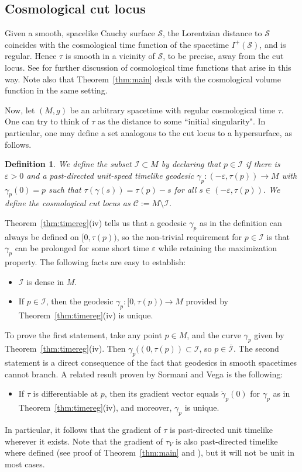 \documentclass[a4paper,11pt]{amsart}
\newtheorem{definition}[theorem]{{Definition}}%
\newcommand{\I}{\mathcal{I}}
\newcommand{\CS}{\mathcal{S}}
\begin{document}
\subsection{Cosmological cut locus}

Given a smooth, spacelike Cauchy surface $\CS$, the Lorentzian distance to $\CS$ coincides with the cosmological time function of the spacetime $I^+(\CS)$, and is regular. Hence $\tau$ is smooth in a vicinity of $\CS$, to be precise, away from the cut locus. See \cite{GrSo22} for further discussion of cosmological time functions that arise in this way. Note also that Theorem~\ref{thm:main} deals with the cosmological volume function in the same setting.

Now, let $(M,g)$ be an arbitrary spacetime with regular cosmological time $\tau$. One can try to think of $\tau$ as the distance to some ``initial singularity". In particular, one may define a set analogous to the cut locus to a hypersurface, as follows.

\begin{definition} \label{def:I}
 We define the subset $\I \subset M$ by declaring that $p \in \I$ if there is $\varepsilon > 0$ and a past-directed unit-speed timelike geodesic $\gamma_p \colon (-\varepsilon, \tau(p)) \to M$ with $\gamma_p(0) = p$ such that $\tau(\gamma(s)) = \tau(p) - s$ for all $s \in (-\varepsilon, \tau(p))$. We define the \emph{cosmological cut locus} as $\mathcal{C} := M \setminus \I$.
\end{definition}

Theorem~\ref{thm:timereg}(iv) tells us that a geodesic $\gamma_p$ as in the definition can always be defined on $[0,\tau(p))$, so the non-trivial requirement for $p \in \I$ is that $\gamma_p$ can be prolonged for some short time $\varepsilon$ while retaining the maximization property. The following facts are easy to establish:
\begin{itemize}
 \item $\I$ is dense in $M$.
 \item If $p \in \I$, then the geodesic $\gamma_p \colon [0,\tau(p)) \to M$ provided by Theorem~\ref{thm:timereg}(iv) is unique.
\end{itemize}
To prove the first statement, take any point $p \in M$, and the curve $\gamma_p$ given by Theorem~\ref{thm:timereg}(iv). Then $\gamma_p((0,\tau(p)) \subset \I$, so $p \in \overline{\I}$. The second statement is a direct consequence of the fact that geodesics in smooth spacetimes cannot branch. A related result proven by Sormani and Vega \cite[Prop.~5.3]{SoVe16} is the following:
\begin{itemize}
    \item If $\tau$ is differentiable at $p$, then its gradient vector equals $\dot \gamma_p(0)$ for $\gamma_p$ as in Theorem~\ref{thm:timereg}(iv), and moreover, $\gamma_p$ is unique.
\end{itemize}
In particular, it follows that the gradient of $\tau$ is past-directed unit timelike wherever it exists. Note that the gradient of $\tau_V$ is also past-directed timelike where defined (see proof of Theorem~\ref{thm:main} and \cite[p.~2810]{CGM16}), but it will not be unit in most cases.
\end{document}
